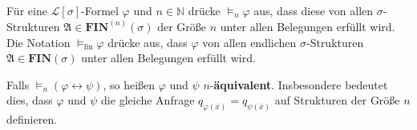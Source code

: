\begin{defn}
Für eine $\mathcal{L}\left[\sigma\right]$-Formel $\varphi$ und $n\in\mathbb{N}$
drücke $\models_{n}\varphi$ aus, dass diese von allen $\sigma$-Strukturen
$\mathfrak{A}\in\mathbf{FIN}^{\left(n\right)}\left(\sigma\right)$
der Größe $n$ unter allen Belegungen erfüllt wird. Die Notation $\models_{\mathrm{fin}}\varphi$
drücke aus, dass $\varphi$ von allen endlichen $\sigma$-Strukturen
$\mathfrak{A}\in\mathbf{FIN}\left(\sigma\right)$ unter allen Belegungen
erfüllt wird.

Falls $\models_{n}\left(\varphi\leftrightarrow\psi\right)$, so heißen
$\varphi$ und $\psi$ $n$-\textbf{äquivalent}. Insbesondere bedeutet
dies, dass $\varphi$ und $\psi$ die gleiche Anfrage $q_{\varphi\left(\bar{x}\right)}=q_{\psi\left(\bar{x}\right)}$
auf Strukturen der Größe $n$ definieren.
\end{defn}

